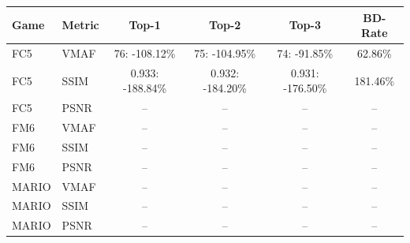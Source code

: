 \begin{tabular}{llcccc}
\toprule
Game & Metric & Top-1 & Top-2 & Top-3 & BD-Rate \\
\midrule
FC5 & VMAF & 76: -108.12\% & 75: -104.95\% & 74: -91.85\% & 62.86\% \\
FC5 & SSIM & 0.933: -188.84\% & 0.932: -184.20\% & 0.931: -176.50\% & 181.46\% \\
FC5 & PSNR & -- & -- & -- & -- \\
\midrule
FM6 & VMAF & -- & -- & -- & -- \\
FM6 & SSIM & -- & -- & -- & -- \\
FM6 & PSNR & -- & -- & -- & -- \\
\midrule
MARIO & VMAF & -- & -- & -- & -- \\
MARIO & SSIM & -- & -- & -- & -- \\
MARIO & PSNR & -- & -- & -- & -- \\
\bottomrule
\end{tabular}
